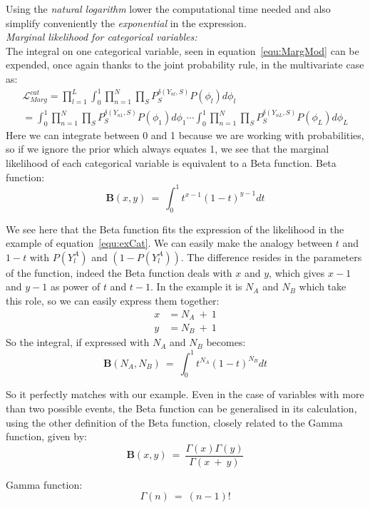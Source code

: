 \documentclass[twocolumn,12pt]{article}
\begin{document}
Using the \emph{natural logarithm} lower the computational time needed and also simplify conveniently the \emph{exponential} in the expression.\\
\emph{Marginal likelihood for categorical variables:}\\
The integral on one categorical variable, seen in equation~\ref{equ:MargMod} can be expended, once again thanks to the joint probability rule, in the multivariate case as:
\begin{align}
    \mathcal{L}_{Marg}^{cat} = \prod_{l=1}^L\int_0^1\prod_{n=1}^N\prod_SP_{S}^{\delta(Y_{nl},S)}P(\phi_l)d\phi_l\nonumber\\
    = \int_0^1\prod_{n=1}^N\prod_SP_{S}^{\delta(Y_{n1},S)}P(\phi_1)d\phi_1\cdots\int_0^1\prod_{n=1}^N\prod_SP_{S}^{\delta(Y_{nL},S)}P(\phi_L)d\phi_L
    \label{equ:LmargCat}
\end{align}
Here we can integrate between 0 and 1 because we are working with probabilities, so if we ignore the prior which always equates 1, we see that the marginal likelihood of each categorical variable is equivalent to a Beta function.
Beta function:\\
$$\textbf{B}(x,y)\ =\ \int_0^1t^{x-1}(1-t)^{y-1}dt$$


We see here that the Beta function fits the expression of the likelihood in the example of equation~\ref{equ:exCat}.
We can easily make the analogy between $t$ and $1-t$ with $P(Y_{l}^A)$ and $(1-P(Y_{l}^A))$.
The difference resides in the parameters of the function, indeed the Beta function deals with $x$ and $y$, which gives $x-1$ and $y-1$ as power of $t$ and $t-1$. In the example it is $N_A$ and $N_B$ which take this role, so we can easily express them together:
\begin{align}
    x &= N_A\ +\ 1\\
    y &= N_B\ +\ 1
\end{align}
So the integral, if expressed with $N_A$ and $N_B$ becomes:\\
$$\textbf{B}(N_A,N_B)\ =\ \int_0^1t^{N_A}(1-t)^{N_B}dt$$


So it perfectly matches with our example. Even in the case of variables with more than two possible events, the Beta function can be generalised in its calculation, using the other definition of the Beta function, closely related to the Gamma function, given by:\\
$$\textbf{B}(x,y)\ =\ \frac{\Gamma(x)\Gamma(y)}{\Gamma(x\ +\ y)}$$


Gamma function:\\
$$\Gamma(n)\ =\ (n-1)!$$
\end{document}
